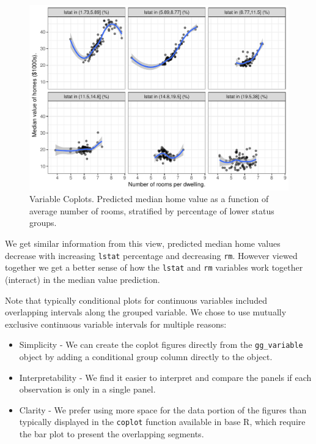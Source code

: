 \documentclass[article]{jss}
\begin{document}
\begin{CodeChunk}
\begin{figure}

{\centering \includegraphics{Regression-rfsrc_files/figure-latex/coplots2-1} 

}

\caption[Variable Coplots]{Variable Coplots. Predicted median home value as a function of average number of rooms, stratified by percentage of lower status groups.}\label{fig:coplots2}
\end{figure}
\end{CodeChunk}

We get similar information from this view, predicted median home values
decrease with increasing \texttt{lstat} percentage and decreasing
\texttt{rm}. However viewed together we get a better sense of how the
\texttt{lstat} and \texttt{rm} variables work together (interact) in the
median value prediction.

Note that typically \citep{cleveland:1993} conditional plots for
continuous variables included overlapping intervals along the grouped
variable. We chose to use mutually exclusive continuous variable
intervals for multiple reasons:

\begin{itemize}
\item
  Simplicity - We can create the coplot figures directly from the
  \texttt{gg\_variable} object by adding a conditional group column
  directly to the object.
\item
  Interpretability - We find it easier to interpret and compare the
  panels if each observation is only in a single panel.
\item
  Clarity - We prefer using more space for the data portion of the
  figures than typically displayed in the \texttt{coplot} function
  available in base R, which require the bar plot to present the
  overlapping segments.
\end{itemize}
\end{document}
